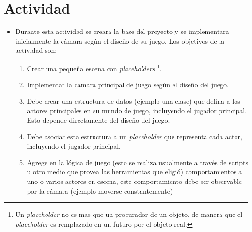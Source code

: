 \section{Actividad}
\begin{itemize}
\item Durante esta actividad se creara la base del proyecto y se implementara inicialmente la cámara según el diseño de su juego. Los objetivos de la actividad son:
\begin{enumerate}
  \item Crear una pequeña escena con \emph{placeholders} \footnote{Un \emph{placeholder} no es mas que un procurador de un objeto, de manera que el \emph{placeholder} es remplazado en un futuro por el objeto real.}.
  \item Implementar la cámara principal de juego según el diseño del juego.
  \item Debe crear una estructura de datos (ejemplo una clase) que defina a los actores principales en su mundo de juego, incluyendo el jugador principal. Esto depende directamente del diseño del juego.
  \item Debe asociar esta estructura a un \emph{placeholder} que representa cada actor, incluyendo el jugador principal.
  \item Agrege en la lógica de juego (esto se realiza usualmente a través de scripts u otro medio que provea las herramientas que eligió) comportamientos a uno o varios actores en escena, este comportamiento debe ser observable por la cámara (ejemplo moverse constantemente)
\end{enumerate}
\end{itemize}